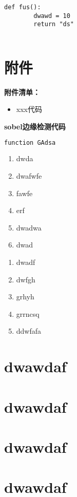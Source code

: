 \documentclass{my_paper}
\begin{document}
\begin{lstlisting}[style = python_style,frame=trBL]
    def fus():
        dwawd = 10
        return "ds"
    
\end{lstlisting}
\newpage
\section{附件}
\appendix
\textbf{附件清单：}
\begin{itemize}
    \item xxx代码
\end{itemize}

\textbf{sobel边缘检测代码}
\begin{framed}
\begin{lstlisting}[language=python]
    function GAdsa 
\end{lstlisting}
\end{framed}

\begin{enumerate}
    \item dwda
    \item dwafwfe
    \item fawfe
    \item erf
    \item dwadwa
    \item dwad
\end{enumerate}

\renewcommand\theenumi{\roman{enumi}}
\renewcommand\labelenumi{\textbf{附录\theenumi}}
\begin{enumerate}
    \item dwadf
    \item dwfgh
    \item grhyh
    \item grrncsq
    \item ddwfafa
\end{enumerate}

\section{dwawdaf}
\section{dwawdaf}
\section{dwawdaf}
\section{dwawdaf}
\end{document}
